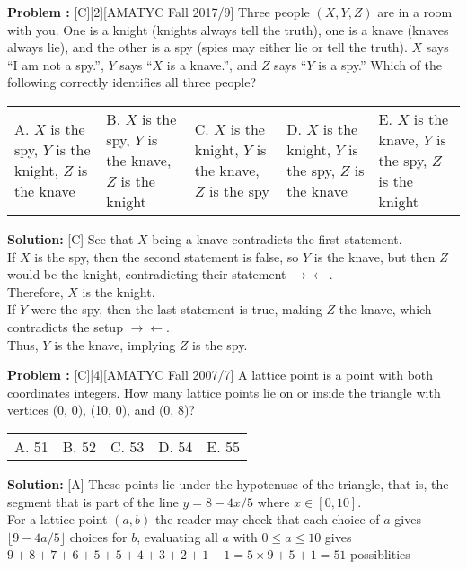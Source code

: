 \documentclass[12pt]{article}
\makeatletter
\newcounter{problem}
\newenvironment{problem}{%
    \stepcounter{problem}
    \noindent\textbf{Problem \theproblem:}%
}{%
    \par
}
\newenvironment{solution}{%
    \vspace{1em} %
    \noindent\textbf{Solution:}%
}{%
    \par
}
\newcommand{\multChoice}[5]{%
    \begin{tabular}{l @{\hskip 1.5cm} l @{\hskip 1.5cm} l @{\hskip 1.5cm} l @{\hskip 1.5cm} l}
    A. #1 & B. #2 & C. #3 & D. #4 & E. #5
\end{tabular}
}
\makeatother
\begin{document}
\begin{problem}[C][2][AMATYC Fall 2017/9]
   Three people $(X, Y, Z)$ are in a room with you. One is a knight (knights always tell the
   truth), one is a knave (knaves always lie), and the other is a spy (spies may either lie or tell the truth). $X$ says “I am not a spy.”, $Y$ says “$X$ is a knave.”, and $Z$ says “$Y$ is a spy.” Which
   of the following correctly identifies all three people? 
   \begin{center}
      \begin{tabular}{l @{\hskip 1.5cm} l @{\hskip 1.5cm} l @{\hskip 1.5cm} l @{\hskip 1.5cm} l}
         A. $X$ is the spy, $Y$ is the knight, $Z$ is the knave & 
         B. $X$ is the spy, $Y$ is the knave, $Z$ is the knight & 
         C. $X$ is the knight, $Y$ is the knave, $Z$ is the spy & 
         D. $X$ is the knight, $Y$ is the spy, $Z$ is the knave & 
         E. $X$ is the knave, $Y$ is the spy, $Z$ is the knight 
      \end{tabular}
      \end{center}
\end{problem}



\begin{solution}[C]
See that $X$ being a knave contradicts the first statement. \\
If $X$ is the spy, then the second statement is false, so $Y$ is the knave, but then $Z$ would be the knight, contradicting their statement $\rightarrow \leftarrow$. \\
Therefore, $X$ is the knight. \\
If $Y$ were the spy, then the last statement is true, making $Z$ the knave, which contradicts the setup $\rightarrow \leftarrow$. \\
Thus, $Y$ is the knave, implying $Z$ is the spy. 
\end{solution}

\begin{problem}[C][4][AMATYC Fall 2007/7]
   A lattice point is a point with both coordinates integers. How many lattice points
    lie on or inside the triangle with vertices (0, 0), (10, 0), and (0, 8)? 
\end{problem}
 \multChoice{51}{52}{53}{54}{55}
\begin{solution}[A]
   These points lie under the hypotenuse of the triangle, that is, the segment that is part of the line $y=8-4x/5$ where $x \in [0,10]$.\\ For a lattice point $(a,b)$ the reader may check that each choice of $a$ gives $ \lfloor 9-4a/5 \rfloor$ choices for $b$, evaluating all $a$ with $0 \leq a \leq 10$ gives \\
    $9+8+7+6+5+5+4+3+2+1+1 = 5 \times 9 + 5 + 1 = 51$ possiblities
\end{solution}
\end{document}
